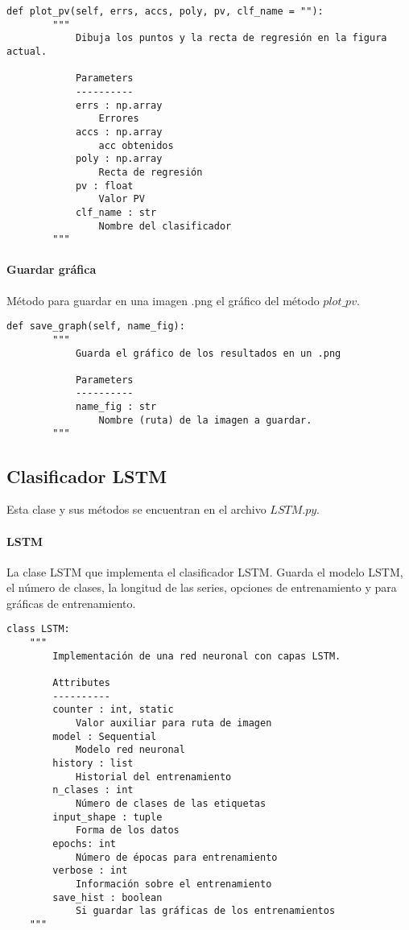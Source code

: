 \begin{lstlisting}
def plot_pv(self, errs, accs, poly, pv, clf_name = ""):
        """
            Dibuja los puntos y la recta de regresión en la figura actual.

            Parameters
            ----------
            errs : np.array
                Errores
            accs : np.array
                acc obtenidos
            poly : np.array
                Recta de regresión
            pv : float
                Valor PV
            clf_name : str
                Nombre del clasificador
        """
\end{lstlisting}

\paragraph{Guardar gráfica}

Método para guardar en una imagen .png el gráfico del método $plot\_pv$.

\begin{lstlisting}
def save_graph(self, name_fig):
        """
            Guarda el gráfico de los resultados en un .png

            Parameters
            ----------
            name_fig : str
                Nombre (ruta) de la imagen a guardar.
        """
\end{lstlisting}

\subsection{Clasificador LSTM}

Esta clase y sus métodos se encuentran en el archivo $LSTM.py$.

\paragraph{LSTM}

La clase LSTM que implementa el clasificador LSTM. Guarda el modelo LSTM, el número de clases, la longitud de las series, opciones de entrenamiento y para gráficas de entrenamiento.

\begin{lstlisting}
class LSTM:
    """
        Implementación de una red neuronal con capas LSTM.

        Attributes
        ----------
        counter : int, static
            Valor auxiliar para ruta de imagen
        model : Sequential
            Modelo red neuronal
        history : list
            Historial del entrenamiento
        n_clases : int
            Número de clases de las etiquetas
        input_shape : tuple
            Forma de los datos
        epochs: int
            Número de épocas para entrenamiento
        verbose : int
            Información sobre el entrenamiento
        save_hist : boolean
            Si guardar las gráficas de los entrenamientos
    """
\end{lstlisting}

